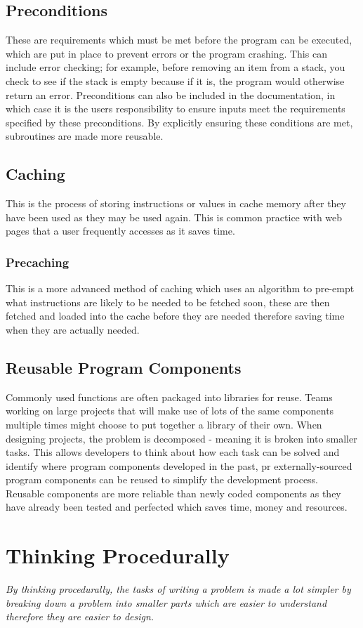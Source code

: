 \documentclass[a4paper,11pt, twocolumn]{article}
\begin{document}
\subsection{Preconditions}
These are requirements which must be met before the program can be executed, which are put in place to prevent errors or the program crashing. This can include error checking; for example, before removing an item from a stack, you check to see if the stack is empty because if it is, the program would otherwise return an error. Preconditions can also be included in the documentation, in which case it is the users responsibility to ensure inputs meet the requirements specified by these preconditions. By explicitly ensuring these conditions are met, subroutines are made more reusable.
\subsection{Caching}
This is the process of storing instructions or values in cache memory after they have been used as they may be used again. This is common practice with web pages that a user frequently accesses as it saves time.
\subsubsection{Precaching}
This is a more advanced method of caching which uses an algorithm to pre-empt what instructions are likely to be needed to be fetched soon, these are then fetched and loaded into the cache before they are needed therefore saving time when they are actually needed.
\subsection{Reusable Program Components}
Commonly used functions are often packaged into libraries for reuse. Teams working on large projects that will make use of lots of the same components multiple times might choose to put together a library of their own. When designing projects, the problem is decomposed - meaning it is broken into smaller tasks. This allows developers to think about how each task can be solved and identify where program components developed in the past, pr externally-sourced program components can be reused to simplify the development process. Reusable components are more reliable than newly coded components as they have already been tested and perfected which saves time, money and resources. 

\section{Thinking Procedurally}
\textit{By thinking procedurally, the tasks of writing a problem is made a lot simpler by breaking down a problem into smaller parts which are easier to understand therefore they are easier to design.}
\end{document}
